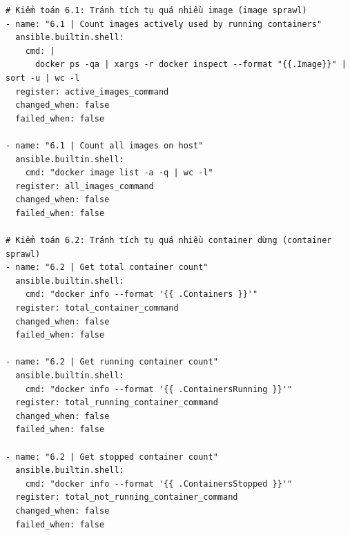 {\footnotesize
\begin{verbatim}
# Kiểm toán 6.1: Tránh tích tụ quá nhiều image (image sprawl)
- name: "6.1 | Count images actively used by running containers"
  ansible.builtin.shell:
    cmd: |
      docker ps -qa | xargs -r docker inspect --format "{{.Image}}" | sort -u | wc -l
  register: active_images_command
  changed_when: false
  failed_when: false

- name: "6.1 | Count all images on host"
  ansible.builtin.shell:
    cmd: "docker image list -a -q | wc -l"
  register: all_images_command
  changed_when: false
  failed_when: false

# Kiểm toán 6.2: Tránh tích tụ quá nhiều container dừng (container sprawl)
- name: "6.2 | Get total container count"
  ansible.builtin.shell:
    cmd: "docker info --format '{{ .Containers }}'"
  register: total_container_command
  changed_when: false
  failed_when: false

- name: "6.2 | Get running container count"
  ansible.builtin.shell:
    cmd: "docker info --format '{{ .ContainersRunning }}'"
  register: total_running_container_command
  changed_when: false
  failed_when: false

- name: "6.2 | Get stopped container count"
  ansible.builtin.shell:
    cmd: "docker info --format '{{ .ContainersStopped }}'"
  register: total_not_running_container_command
  changed_when: false
  failed_when: false
\end{verbatim}
}
